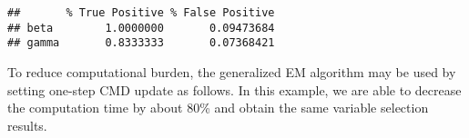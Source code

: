 \begin{Shaded}
\begin{Highlighting}[]
\StringTok{ }
\StringTok{ }
        \NormalTok{(}\NormalTok{ =}\StringTok{ }\NormalTok{(b[b0 }\OperatorTok{!=}\StringTok{ }\NormalTok{] }\OperatorTok{!=}\StringTok{ }\NormalTok{),}
          \NormalTok{ =}\StringTok{ }\NormalTok{(b[b0 }\OperatorTok{==}\StringTok{ }\NormalTok{] }\OperatorTok{!=}\StringTok{ }\NormalTok{))}
\NormalTok{    \}}
    \NormalTok{(} \NormalTok{(}\OperatorTok{$}
           \NormalTok{(}\OperatorTok{$}
\NormalTok{\}}
\end{Highlighting}
\end{Shaded}

\begin{verbatim}
##       % True Positive % False Positive
## beta        1.0000000       0.09473684
## gamma       0.8333333       0.07368421
\end{verbatim}

To reduce computational burden, the generalized EM algorithm may be used
by setting one-step CMD update as follows. In this example, we are able
to decrease the computation time by about 80\% and obtain the same
variable selection results.

\begin{Shaded}
\begin{Highlighting}[]
\NormalTok{(\{}
\StringTok{ }\NormalTok{(}
        \OperatorTok{$}\OperatorTok{$}
         \NormalTok{, } \NormalTok{,}
         \NormalTok{, } \NormalTok{,}
         \NormalTok{, } 
\NormalTok{    )}
\NormalTok{\})}
\end{Highlighting}
\end{Shaded}

